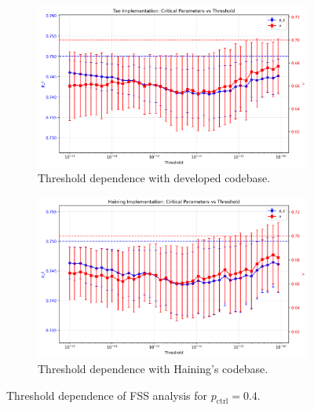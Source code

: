 \documentclass[11pt,a4paper]{article}
\begin{document}
\begin{figure}[H]
    \centering
    \begin{subfigure}[t]{0.48\linewidth}
        \centering
        \includegraphics[width=\linewidth]{threshold_dependence_tao_pctrl0.4.png}
        \caption{Threshold dependence with developed codebase.}
        \label{fig:threshold_dependence_developed_pctrl0.400}
    \end{subfigure}
    \hfill
    \begin{subfigure}[t]{0.48\linewidth}
        \centering
        \includegraphics[width=\linewidth]{threshold_dependence_haining_pctrl0.4.png}
        \caption{Threshold dependence with Haining's codebase.}
        \label{fig:threshold_dependence_haining_pctrl0.400}
    \end{subfigure}
    \caption{Threshold dependence of FSS analysis for $p_\text{ctrl}=0.4$.}
    \label{fig:threshold_dependence_combined_pctrl0.400}
\end{figure}
\end{document}
